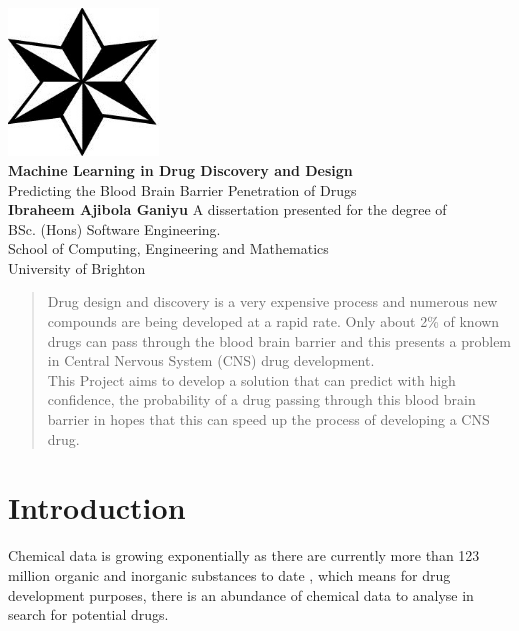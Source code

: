 \documentclass[a4paper,12pt]{report}
\begin{document}
\begin{titlepage}
	\begin{center}
		\includegraphics[scale=1,width=0.3\textwidth]{images/uob_logo} \\
		\huge
		\textbf{Machine Learning in Drug Discovery and Design\\}
		\vspace{0.5cm}
		\Large
		Predicting the Blood Brain Barrier Penetration of Drugs \\
		\vspace{1.5cm}
		\textbf{Ibraheem Ajibola Ganiyu}
		\vfill
		A dissertation presented for the degree of \\
		BSc. (Hons) Software Engineering. \\
		\vspace{0.8cm}
		\large
		School of Computing, Engineering and Mathematics \\
		University of Brighton \\
		\date{\today}
	\end{center}
\end{titlepage}

\tableofcontents
\newpage
\listoffigures
\listoftables
\listoflistings
\newpage
{}


\begin{abstract}
	Drug design and discovery is a very expensive process and numerous new compounds are being developed at a rapid rate. Only about 2\% of known drugs can pass through the blood brain barrier and this presents a problem in Central Nervous System (CNS) drug development. \\
	This Project aims to develop a solution that can predict with high confidence, the probability of a drug passing through this blood brain barrier in hopes that this can speed up the process of developing a CNS drug.
\end{abstract}

\chapter{Introduction}
	Chemical data is growing exponentially as there are currently more than 123 million organic and inorganic substances to date \cite{CAS2016}, which means for drug development purposes, there is an abundance of chemical data to analyse in search for potential drugs. 
	
\end{document}
